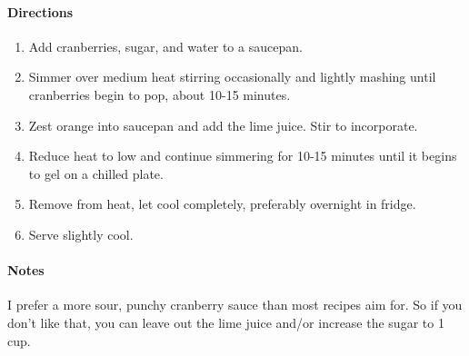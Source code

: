 \documentclass[12pt]{article}
\newenvironment*{notes}
	{
		\paragraph*{Notes}
		\hfill \newline
		\begin{adjustwidth}{1cm}{}
	}
	{
		\end{adjustwidth}
	}
\begin{document}
	\paragraph*{Directions}
	
	\begin{enumerate}
		\item Add cranberries, sugar, and water to a saucepan.
		\item Simmer over medium heat stirring occasionally and lightly mashing until cranberries begin to pop, about 10-15 minutes.
		\item Zest orange into saucepan and add the lime juice. Stir to incorporate.
		\item Reduce heat to low and continue simmering for 10-15 minutes until it begins to gel on a chilled plate.
		\item Remove from heat, let cool completely, preferably overnight in fridge.
		\item Serve slightly cool.
	\end{enumerate}
	
	\begin{notes}
		I prefer a more sour, punchy cranberry sauce than most recipes aim for. So if you don’t like that, you can leave out the lime juice and/or increase the sugar to 1 cup.
	\end{notes}
	
\end{document}
